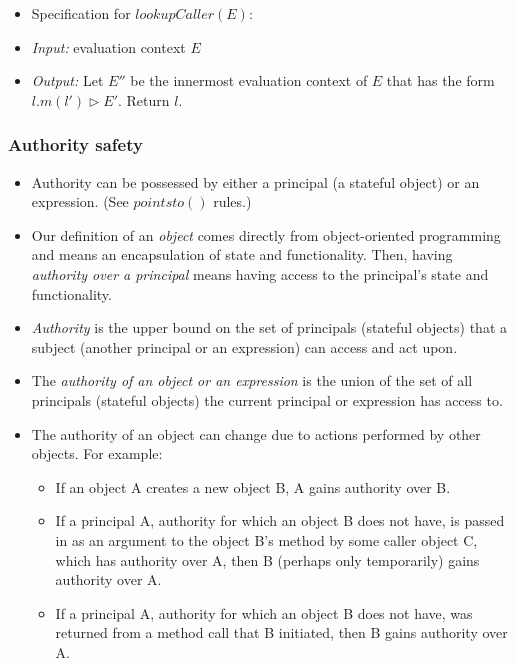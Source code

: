 \documentclass{llncs}
\begin{document}
\begin{itemize}
\item Specification for $lookupCaller(E)$:
\item[] \emph{Input:} evaluation context $E$
\item[] \emph{Output:} Let $E''$ be the innermost evaluation context of $E$ that has the form $l.m(l') \rhd E'$. Return $l$.

\end{itemize}


\subsubsection{Authority safety}

\begin{itemize}
\item Authority can be possessed by either a principal (a stateful object) or an expression. (See $pointsto()$ rules.)

\item Our definition of an \emph{object} comes directly from object-oriented programming and means an encapsulation of state and functionality. Then, having \emph{authority over a principal} means having access to the principal's state and functionality.

\item \emph{Authority} is the upper bound on the set of principals (stateful objects) that a subject (another principal or an expression) can access and act upon.

\item The \emph{authority of an object or an expression} is the union of the set of all principals (stateful objects) the current principal or expression has access to.

\item The authority of an object can change due to actions performed by other objects. For example:
\begin{itemize}
\item If an object A creates a new object B, A gains authority over B.
\item If a principal A, authority for which an object B does not have, is passed in as an argument to the object B's method by some caller object C, which has authority over A, then B (perhaps only temporarily) gains authority over A.
\item If a principal A, authority for which an object B does not have, was returned from a method call that B initiated, then B gains authority over A.
\end{itemize}


\end{itemize}
\end{document}
